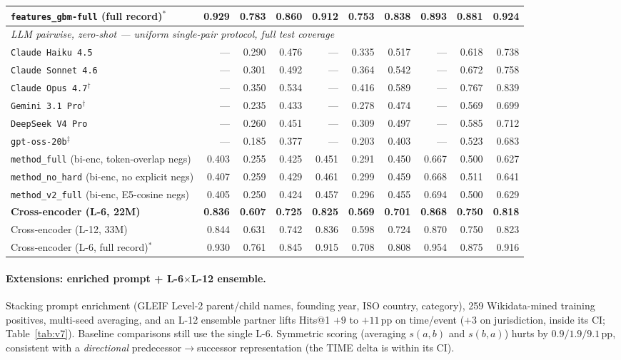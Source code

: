 \documentclass[sigconf]{acmart}
\begin{document}
\begin{table}[t]
\begin{tabular}{l rrr rrr rrr}
    \texttt{features\_gbm-full} (full record)$^{*}$ & 0.929 & 0.783 & 0.860 & 0.912 & 0.753 & 0.838 & 0.893 & 0.881 & 0.924 \\
    \midrule
    \multicolumn{10}{l}{\emph{LLM pairwise, zero-shot --- uniform single-pair protocol, full test coverage}} \\
    \texttt{Claude Haiku 4.5}        & --- & 0.290 & 0.476 & --- & 0.335 & 0.517 & --- & 0.618 & 0.738 \\
    \texttt{Claude Sonnet 4.6}       & --- & 0.301 & 0.492 & --- & 0.364 & 0.542 & --- & 0.672 & 0.758 \\
    \texttt{Claude Opus 4.7}$^{\dag}$ & --- & 0.350 & 0.534 & --- & 0.416 & 0.589 & --- & 0.767 & 0.839 \\
    \texttt{Gemini 3.1 Pro}$^{\dag}$  & --- & 0.235 & 0.433 & --- & 0.278 & 0.474 & --- & 0.569 & 0.699 \\
    \texttt{DeepSeek V4 Pro}         & --- & 0.260 & 0.451 & --- & 0.309 & 0.497 & --- & 0.585 & 0.712 \\
    \texttt{gpt-oss-20b}$^{\ddag}$   & --- & 0.185 & 0.377 & --- & 0.203 & 0.403 & --- & 0.523 & 0.683 \\
    \midrule
    \texttt{method\_full} (bi-enc, token-overlap negs)   & 0.403 & 0.255 & 0.425 & 0.451 & 0.291 & 0.450 & 0.667 & 0.500 & 0.627 \\
    \texttt{method\_no\_hard} (bi-enc, no explicit negs) & 0.407 & 0.259 & 0.429 & 0.461 & 0.299 & 0.459 & 0.668 & 0.511 & 0.641 \\
    \texttt{method\_v2\_full} (bi-enc, E5-cosine negs)   & 0.405 & 0.250 & 0.424 & 0.457 & 0.296 & 0.455 & 0.694 & 0.500 & 0.629 \\
    \midrule
    \textbf{Cross-encoder (L-6, 22M)} & \textbf{0.836} & \textbf{0.607} & \textbf{0.725} & \textbf{0.825} & \textbf{0.569} & \textbf{0.701} & \textbf{0.868} & \textbf{0.750} & \textbf{0.818} \\
    Cross-encoder (L-12, 33M)      & 0.844 & 0.631 & 0.742 & 0.836 & 0.598 & 0.724 & 0.870 & 0.750 & 0.823 \\
    Cross-encoder (L-6, full record)$^{*}$ & 0.930 & 0.761 & 0.845 & 0.915 & 0.708 & 0.808 & 0.954 & 0.875 & 0.916 \\
    \bottomrule
  \end{tabular}
\end{table}

\paragraph{Extensions: enriched prompt + L-6$\times$L-12 ensemble.}
Stacking prompt enrichment (GLEIF Level-2 parent/child names,
founding year, ISO country, category), 259 Wikidata-mined training
positives, multi-seed averaging, and an L-12 ensemble partner lifts
Hits@1 $+9$ to $+11$\,pp on time/event ($+3$ on jurisdiction,
inside its CI; Table~\ref{tab:v7}). Baseline comparisons still use
the single L-6. Symmetric scoring (averaging $s(a,b)$ and $s(b,a)$)
hurts by $0.9/1.9/9.1$\,pp, consistent with a \emph{directional}
predecessor$\to$successor representation (the TIME delta is within
its CI).
\end{document}
